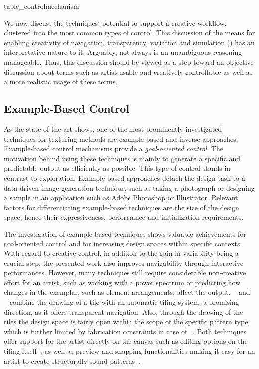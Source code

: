 {table_controlmechanism}

We now discuss the techniques' potential to support a creative workflow, clustered into the most common types of control. This discussion of the means for enabling creativity of navigation, transparency, variation and simulation () has an interpretative nature to it. Arguably, not always is an unambiguous reasoning manageable. Thus, this discussion should be viewed as a step toward an objective discussion about terms such as artist-usable and creatively controllable as well as a more realistic usage of these terms.

\subsection{Example-Based Control}
\label{subsubsec:analysis_creative_means_example}

As the state of the art shows, one of the most prominently investigated techniques for texturing methods are example-based and inverse approaches. Example-based control mechanisms provide a \textit{goal-oriented control}. The motivation behind using these techniques is mainly to generate a specific and predictable output as efficiently as possible. This type of control stands in contrast to exploration. Example-based approaches detach the design task to a data-driven image generation technique, such as taking a photograph or designing a sample in an application such as Adobe Photoshop or Illustrator. Relevant factors for differentiating example-based techniques are the size of the design space, hence their expressiveness, performance and initialization requirements. 

The investigation of example-based techniques shows valuable achievements for goal-oriented control and for increasing design spaces within specific contexts. With regard to creative control, in addition to the gain in variability being a crucial step, the presented work also improves navigability through interactive performances. However, many techniques still require considerable non-creative effort for an artist, such as working with a power spectrum or predicting how changes in the exemplar, such as element arrangements, affect the output. \citeauthor*{tu_2020_cct}~\cite{tu_2020_cct} and \citeauthor*{bian_2018_tpd}~\cite{bian_2018_tpd} combine the drawing of a tile with an automatic tiling system, a promising direction, as it offers transparent navigation. Also, through the drawing of the tiles the design space is fairly open within the scope of the specific pattern type, which is further limited by fabrication constraints in case of \citeauthor*{bian_2018_tpd}~\cite{bian_2018_tpd}. Both techniques offer support for the artist directly on the canvas such as editing options on the tiling itself~\cite{tu_2020_cct}, as well as preview and snapping functionalities making it easy for an artist to create structurally sound patterns~\cite{bian_2018_tpd}. 

